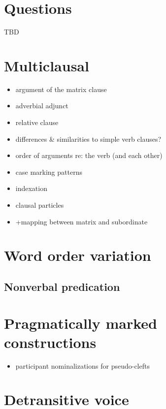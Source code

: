 \documentclass{memoir}
\begin{document}
\chapter{\texorpdfstring{Questions \label{questions}}{Questions }}

TBD

\chapter{\texorpdfstring{Multiclausal
\label{multiclausal}}{Multiclausal }}

\begin{itemize}
\item
  argument of the matrix clause
\item
  adverbial adjunct
\item
  relative clause
\item
  differences \& similarities to simple verb clauses?
\item
  order of arguments re: the verb (and each other)
\item
  case marking patterns
\item
  indexation
\item
  clausal particles
\item
  +mapping between matrix and subordinate
\end{itemize}

\chapter{\texorpdfstring{Word order variation
\label{wordorder}}{Word order variation }}

\section{\texorpdfstring{Nonverbal predication
\label{nvp-order}}{Nonverbal predication }}

\chapter{\texorpdfstring{Pragmatically marked constructions
\label{pragmarked}}{Pragmatically marked constructions }}

\begin{itemize}
\tightlist
\item
  participant nominalizations for pseudo-clefts
\end{itemize}

\chapter{\texorpdfstring{Detransitive voice
\label{voice}}{Detransitive voice }}
\end{document}
